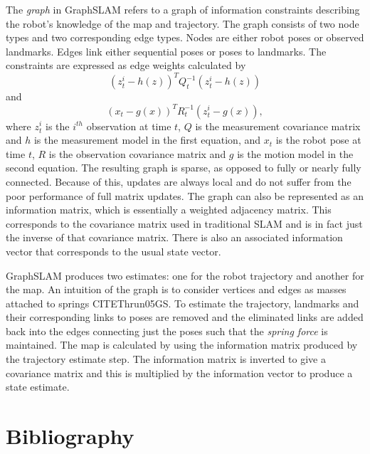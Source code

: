 \documentclass[12pt]{report}
\begin{document}
The \emph{graph} in GraphSLAM refers to a graph of information constraints describing the robot's knowledge of the map and trajectory.  The graph consists of two node types and two corresponding edge types.  Nodes are either robot poses or observed landmarks.  Edges link either sequential poses or poses to landmarks.  The constraints are expressed as edge weights calculated by 
\begin{equation}\label{constraint1}
(z_{t}^{i} - h(z))^TQ_{t}^{-1}(z_{t}^{i} - h(z)) 
\end{equation}
and 
\begin{equation}\label{constraint2}
(x_{t} - g(x))^TR_{t}^{-1}(z_{t}^{i} - g(x)),
\end{equation}
 where $z_t^i$ is the $i^{th}$ observation at time $t$, $Q$ is the measurement covariance matrix and $h$ is the measurement model in the first equation, and $x_{t}$ is the robot pose at time $t$, $R$ is the observation covariance matrix and $g$ is the motion model in the second equation.  The resulting graph is sparse, as opposed to fully or nearly fully connected.  Because of this, updates are always local and do not suffer from the poor performance of full matrix updates.  The graph can also be represented as an information matrix, which is essentially a weighted adjacency matrix.  This corresponds to the covariance matrix used in traditional SLAM and is in fact just the inverse of that covariance matrix.  There is also an associated information vector that corresponds to the usual state vector.  

GraphSLAM produces two estimates: one for the robot trajectory and another for the map.  An intuition of the graph is to consider vertices and edges as masses attached to springs CITE{Thrun05GS}.  To estimate the trajectory, landmarks and their corresponding links to poses are removed and the eliminated links are added back into the edges connecting just the poses such that the \emph{spring force} is maintained.  The map is calculated by using the information matrix produced by the trajectory estimate step.  The information matrix is inverted to give a covariance matrix and this is multiplied by the information vector to produce a state estimate.  


\chapter{Bibliography}

{}
\end{document}
